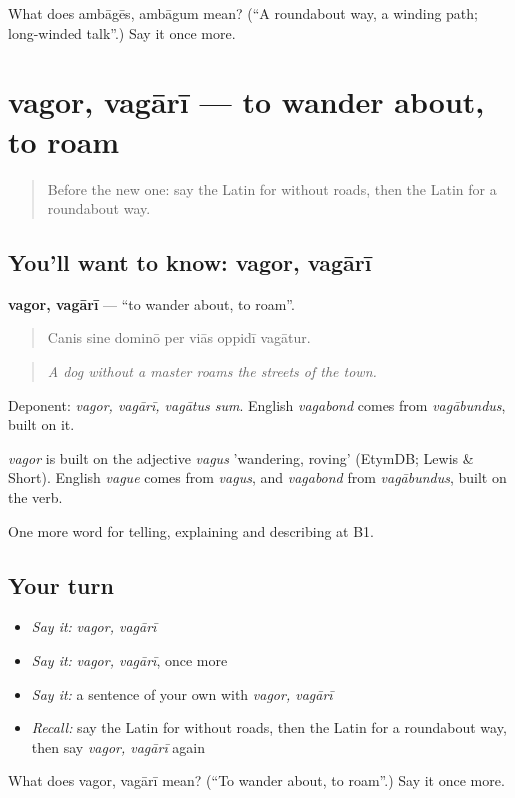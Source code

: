 \begin{tcolorbox}[breakable,colback=teal!4,colframe=teal!35!black,title={Before you move on}]
What does ambāgēs, ambāgum mean? (\textquotedblleft{}A roundabout way, a winding path; long-winded talk\textquotedblright{}.) Say it once more.
\end{tcolorbox}
\section[vagor, vagārī]{vagor, vagārī — to wander about, to roam}

\label{lesson:LA-C452-vagor}



\begin{quote}
Before the new one: say the Latin for without roads, then the Latin for a roundabout way.
\end{quote}

\subsection*{You'll want to know: vagor, vagārī}
\textbf{vagor, vagārī} — \textquotedblleft{}to wander about, to roam\textquotedblright{}.

\begin{quote}
Canis sine dominō per viās oppidī vagātur.
\end{quote}

\begin{quote}
\emph{A dog without a master roams the streets of the town.}
\end{quote}

Deponent: \emph{vagor, vagārī, vagātus sum}. English \emph{vagabond} comes from \emph{vagābundus}, built on it.

\begin{cousinweb}
\emph{vagor} is built on the adjective \emph{vagus} 'wandering, roving' (EtymDB; Lewis \& Short). English \emph{vague} comes from \emph{vagus}, and \emph{vagabond} from \emph{vagābundus}, built on the verb.
\end{cousinweb}

\begin{grammarlens}[title={What you've built}]
One more word for telling, explaining and describing at B1.
\end{grammarlens}

\subsection*{Your turn}
\begin{itemize}
\raggedright
  \item \emph{Say it:} \emph{vagor, vagārī}
  \item \emph{Say it:} \emph{vagor, vagārī}, once more
  \item \emph{Say it:} a sentence of your own with \emph{vagor, vagārī}
  \item \emph{Recall:} say the Latin for without roads, then the Latin for a roundabout way, then say \emph{vagor, vagārī} again
\end{itemize}

\begin{tcolorbox}[breakable,colback=teal!4,colframe=teal!35!black,title={Before you move on}]
What does vagor, vagārī mean? (\textquotedblleft{}To wander about, to roam\textquotedblright{}.) Say it once more.
\end{tcolorbox}

